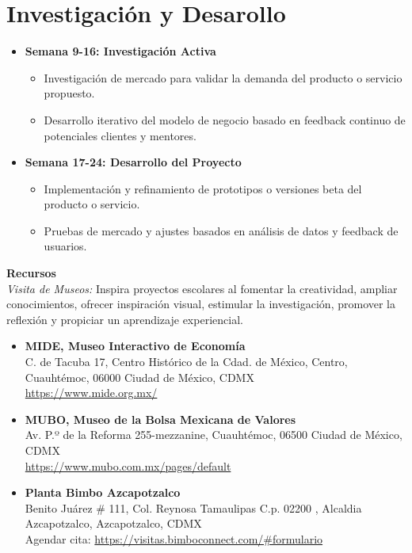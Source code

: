 



\newpage
\section{Investigación y Desarollo}
\begin{itemize}
  \item \textbf{Semana 9-16: Investigación Activa}
  \begin{itemize}
    \item Investigación de mercado para validar la demanda del producto o servicio propuesto.
    \item Desarrollo iterativo del modelo de negocio basado en feedback continuo de potenciales clientes y mentores.
  \end{itemize}
  \item \textbf{Semana 17-24: Desarrollo del Proyecto}
  \begin{itemize}
    \item Implementación y refinamiento de prototipos o versiones beta del producto o servicio.
    \item Pruebas de mercado y ajustes basados en análisis de datos y feedback de usuarios.
  \end{itemize}
\end{itemize}

{\large \textbf{Recursos}}\\
\textit{Visita de Museos:}  Inspira proyectos escolares al fomentar la creatividad, ampliar conocimientos, ofrecer inspiración visual, estimular la investigación, promover la reflexión y propiciar un aprendizaje experiencial.
\begin{itemize}
    \item \textbf{MIDE, Museo Interactivo de Economía} \\ C. de Tacuba 17, Centro Histórico de la Cdad. de México, Centro, Cuauhtémoc, 06000 Ciudad de México, CDMX \\
    \url{https://www.mide.org.mx/}
    \item \textbf{MUBO, Museo de la Bolsa Mexicana de Valores}\\
    Av. P.º de la Reforma 255-mezzanine, Cuauhtémoc, 06500 Ciudad de México, CDMX \\
    \url{https://www.mubo.com.mx/pages/default}
    \item \textbf{Planta Bimbo Azcapotzalco} \\ 
    Benito Juárez \# 111, Col. Reynosa Tamaulipas C.p. 02200 , Alcaldia Azcapotzalco, Azcapotzalco, CDMX \\
    Agendar cita:  
    \url{https://visitas.bimboconnect.com/#formulario}
\end{itemize}


